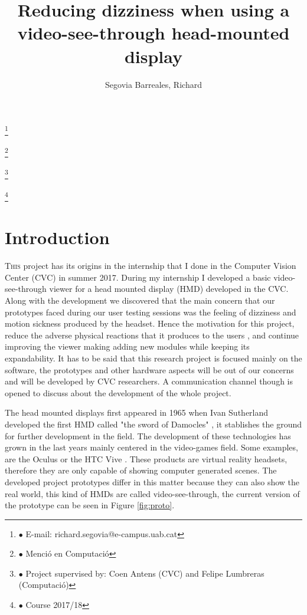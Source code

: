 \documentclass[10pt,a4paper,twocolumn,twoside]{article}
\author{\LARGE\sffamily Segovia Barreales, Richard}
\title{\Huge{\sffamily Reducing dizziness when using a video-see-through head-mounted display}}
\date{}
\newcommand\blfootnote[1]{%
	\begingroup
	\renewcommand\thefootnote{}\footnote{#1}%
	\addtocounter{footnote}{-1}%
	\endgroup
}
\begin{document}
	
	\fancyhead[RO]{\thepage}
	\fancyhead[LE]{\thepage}
	
	\fancyfoot[CO,CE]{}
	
	{
		\fancyhf{}
	}
	
	\renewcommand{\headrulewidth}{0pt}
	\renewcommand{\footrulewidth}{0pt}
	\pagestyle{fancy}
	
	\maketitle
	
	\thispagestyle{primerapagina}
	
	
	\blfootnote{$\bullet$ E-mail: richard.segovia@e-campus.uab.cat}
	\blfootnote{$\bullet$ Menció en Computació}
	\blfootnote{$\bullet$ Project supervised by: Coen Antens (CVC) and Felipe Lumbreras (Computació)}
	\blfootnote{$\bullet$ Course 2017/18}
	
	\section{Introduction}
	
	\lettrine[lines=3]{T}{his} project has its origins in the internship that I done in the Computer Vision Center (CVC) in summer 2017. During my internship I developed a basic video-see-through viewer for a head mounted display (HMD) developed in the CVC. Along with the development we discovered that the main concern that our prototypes faced during our user testing sessions was the feeling of dizziness and motion sickness produced by the headset. Hence the motivation for this project, reduce the adverse physical reactions that it produces to the users \cite{disconfortReview}, \cite{unpublishCVC} and continue improving the viewer making adding new modules while keeping its expandability. It has to be said that this research project is focused mainly on the software, the prototypes and other hardware aspects will be out of our concerns and will be developed by CVC researchers. A communication channel though is opened to discuss about the development of the whole project. 
	
	The head mounted displays first appeared in 1965 when Ivan Sutherland developed the first HMD called "the sword of Damocles" \cite{hdmSutherland}, it stablishes the ground for further development in the field. The development of these technologies has grown in the last years mainly centered in the video-games field. Some examples, are the Oculus \cite{web:oculus} or the HTC Vive \cite{web:vive}. These products are virtual reality headsets, therefore they are only capable of showing computer generated scenes. The developed project prototypes differ in this matter because they can also show the real world, this kind of HMDs are called video-see-through, the current version of the prototype can be seen in Figure \ref{fig:proto}.
	
\end{document}
